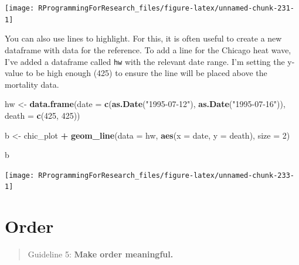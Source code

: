 \documentclass[]{book}
\makeatletter
\newenvironment{Shaded}{\begin{snugshade}}{\end{snugshade}}
\newcommand{\KeywordTok}[1]{\textcolor[rgb]{0.13,0.29,0.53}{\textbf{#1}}}
\newcommand{\DataTypeTok}[1]{\textcolor[rgb]{0.13,0.29,0.53}{#1}}
\newcommand{\DecValTok}[1]{\textcolor[rgb]{0.00,0.00,0.81}{#1}}
\newcommand{\StringTok}[1]{\textcolor[rgb]{0.31,0.60,0.02}{#1}}
\newcommand{\OperatorTok}[1]{\textcolor[rgb]{0.81,0.36,0.00}{\textbf{#1}}}
\newcommand{\NormalTok}[1]{#1}
\newenvironment{kframe}{%
\medskip{}
\setlength{\fboxsep}{.8em}
 \def\at@end@of@kframe{}%
 \ifinner\ifhmode%
  \def\at@end@of@kframe{\end{minipage}}%
  \begin{minipage}{\columnwidth}%
 \fi\fi%
 \def\FrameCommand##1{\hskip\@totalleftmargin \hskip-\fboxsep
 \colorbox{shadecolor}{##1}\hskip-\fboxsep
     \hskip-\linewidth \hskip-\@totalleftmargin \hskip\columnwidth}%
 \MakeFramed {\advance\hsize-\width
   \@totalleftmargin\z@ \linewidth\hsize
   \@setminipage}}%
 {\par\unskip\endMakeFramed%
 \at@end@of@kframe}
\renewenvironment{Shaded}{\begin{kframe}}{\end{kframe}}
\theoremstyle{definition}
\theoremstyle{definition}
\theoremstyle{definition}
\theoremstyle{remark}
\makeatother
\begin{document}
\begin{center}\texttt{[image: RProgrammingForResearch\_files/figure-latex/unnamed-chunk-231-1]} \end{center}

You can also use lines to highlight. For this, it is often useful to
create a new dataframe with data for the reference. To add a line for
the Chicago heat wave, I've added a dataframe called \texttt{hw} with
the relevant date range. I'm setting the y-value to be high enough (425)
to ensure the line will be placed above the mortality data.

\begin{Shaded}
\begin{Highlighting}[]
\NormalTok{hw <-}\StringTok{ }\KeywordTok{data.frame}\NormalTok{(}\DataTypeTok{date =} \KeywordTok{c}\NormalTok{(}\KeywordTok{as.Date}\NormalTok{(}\StringTok{"1995-07-12"}\NormalTok{), }
                          \KeywordTok{as.Date}\NormalTok{(}\StringTok{"1995-07-16"}\NormalTok{)),}
                 \DataTypeTok{death =} \KeywordTok{c}\NormalTok{(}\DecValTok{425}\NormalTok{, }\DecValTok{425}\NormalTok{))}
        
\NormalTok{b <-}\StringTok{ }\NormalTok{chic_plot }\OperatorTok{+}\StringTok{ }
\StringTok{        }\KeywordTok{geom_line}\NormalTok{(}\DataTypeTok{data =}\NormalTok{ hw,}
                  \KeywordTok{aes}\NormalTok{(}\DataTypeTok{x =}\NormalTok{ date, }\DataTypeTok{y =}\NormalTok{ death),}
                  \DataTypeTok{size =} \DecValTok{2}\NormalTok{)}
\end{Highlighting}
\end{Shaded}

\begin{Shaded}
\begin{Highlighting}[]
\NormalTok{b}
\end{Highlighting}
\end{Shaded}

\begin{center}\texttt{[image: RProgrammingForResearch\_files/figure-latex/unnamed-chunk-233-1]} \end{center}

\section{Order}\label{order}

\begin{quote}
Guideline 5: \textbf{Make order meaningful.}
\end{quote}
\end{document}
